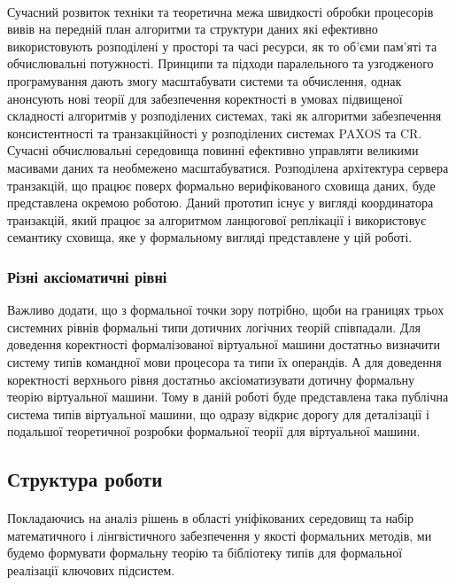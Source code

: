 \documentclass[11pt,oneside]{article}
\begin{document}
   \paragraph{}
   Сучасний розвиток техніки та теоретична межа швидкості обробки процесорів вивів на передній план алгоритми та структури
   даних які ефективно використовують розподілені у просторі та часі ресурси, як то об’єми пам’яті та обчислювальні потужності.
   Принципи та підходи паралельного та узгодженого програмування дають змогу масштабувати системи та обчислення, однак
   анонсують нові теорії для забезпечення коректності в умовах підвищеної складності алгоритмів у розподілених системах,
   такі як алгоритми забезпечення консистентності та транзакційності у розподілених системах PAXOS\cite{lampax} та CR\cite{renesse1}.
   Сучасні обчислювальні середовища повинні ефективно управляти великими масивами
   даних та необмежено масштабуватися. Розподілена архітектура сервера транзакцій,
   що працює поверх формально верифікованого сховища даних, буде представлена
   окремою роботою. Даний прототип існує у вигляді координатора транзакцій, який працює
   за алгоритмом ланцюгової реплікації і використовує семантику сховища, яке
   у формальному вигляді представлене у цій роботі.

\subsubsection{Різні аксіоматичні рівні}

   Важливо додати, що з формальної точки зору потрібно, щоби на границях
   трьох системних рівнів формальні типи дотичних логічних теорій співпадали.
   Для доведення коректності формалізованої віртуальної машини достатньо
   визначити систему типів командної мови процесора та типи їх операндів. А для
   доведення коректності верхнього рівня достатньо аксіоматизувати дотичну
   формальну теорію віртуальної машини. Тому в даній роботі буде представлена
   така публічна система типів віртуальної машини, що одразу відкриє дорогу
   для деталізації і подальшої теоретичної розробки формальної теорії для віртуальної машини.

\newpage

\subsection{Структура роботи}
\vspace{0.5cm}

   \paragraph{}
   Покладаючись на аналіз рішень в області уніфікованих середовищ та
   набір математичного і лінгвістичного забезпечення у якості формальних методів,
   ми будемо формувати формальну теорію та бібліотеку типів для формальної
   реалізації ключових підсистем.
\end{document}
